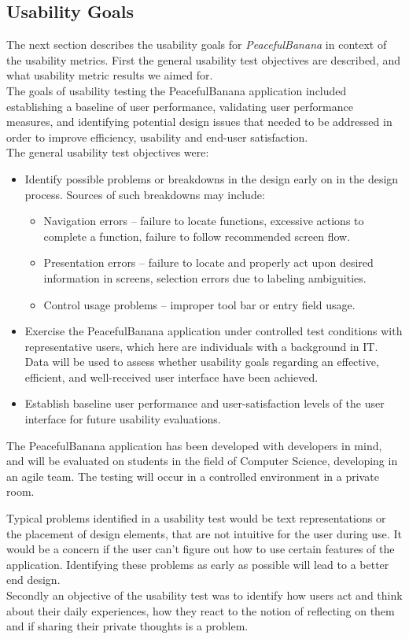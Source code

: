 \subsection{Usability Goals}
The next section describes the usability goals for \emph{PeacefulBanana} in context of the usability metrics. First the general usability test objectives are described, and what usability metric results we aimed for.\\ 
The goals of usability testing the PeacefulBanana application included establishing a baseline of user performance, validating user performance measures, and identifying potential design issues that needed to be addressed in order to improve efficiency, usability and end-user satisfaction. \\
The general usability test objectives were:
\begin{itemize}
	\item Identify possible problems or breakdowns in the design\citep{ref:30} early on in the design process. Sources of such breakdowns may include:
		\begin{itemize}
			\item Navigation errors – failure to locate functions, excessive actions to complete a function, failure to follow recommended screen flow.
			\item Presentation errors – failure to locate and properly act upon desired information in screens, selection errors due to labeling ambiguities.
			\item Control usage problems – improper tool bar or entry field usage.
		\end{itemize}
	\item Exercise the PeacefulBanana application under controlled test conditions with representative users, which here are individuals with a background in IT. Data will be used to assess whether usability goals regarding an effective, efficient, and well-received user interface have been achieved.
	\item Establish baseline user performance and user-satisfaction levels of the user interface for future usability evaluations.
\end{itemize}
The PeacefulBanana application has been developed with developers in mind, and will be evaluated on students in the field of Computer Science, developing in an agile team. The testing will occur in a controlled environment in a private room.

Typical problems identified in a usability test would be text representations or the placement of design elements, that are not intuitive for the user during use. It would be a concern if the user can't figure out how to use certain features of the application. Identifying these problems as early as possible will lead to a better end design. \\
Secondly an objective of the usability test was to identify how users act and think about their daily experiences, how they react to the notion of reflecting on them and if sharing their private thoughts is a problem. 

